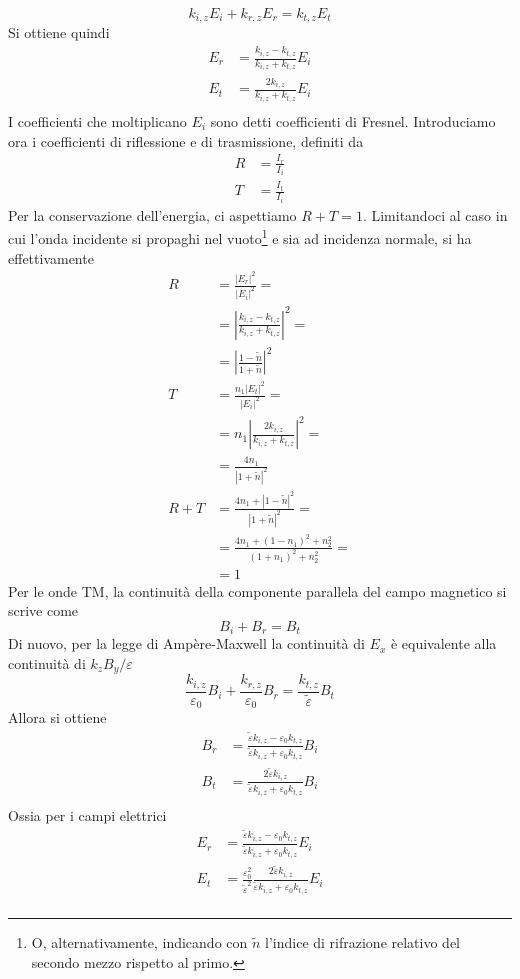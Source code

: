 \documentclass[a4paper,11pt]{book}
\newcommand{\R}{\mathbb{R}}
\theoremstyle{theorem}
\theoremstyle{definition}
\begin{document}
\[k_{i,z}E_i+k_{r,z}E_r=k_{t,z}E_t\]
Si ottiene quindi
\begin{align*}
	E_r&=\frac{k_{i,z}-k_{t,z}}{k_{i,z}+k_{t,z}}E_i\\
	E_t&=\frac{2k_{i,z}}{k_{i,z}+k_{t,z}}E_i\\
\end{align*}
I coefficienti che moltiplicano $E_i$ sono detti coefficienti di Fresnel. Introduciamo ora i coefficienti di riflessione e di trasmissione, definiti da
\begin{align*}
	R&=\frac{I_r}{I_i}\\T&=\frac{I_t}{I_i}
\end{align*}
Per la conservazione dell'energia, ci aspettiamo $R+T=1$. Limitandoci al caso in cui l'onda incidente si propaghi nel vuoto\footnote{O, alternativamente, indicando con $\tilde{n}$ l'indice di rifrazione relativo del secondo mezzo rispetto al primo.} e sia ad incidenza normale, si ha effettivamente
\begin{align*}
	R&=\frac{|E_r|^2}{|E_i|^2}=\\&=\left|\frac{k_{i,z}-k_{t,z}}{k_{i,z}+k_{t,z}}\right|^2=\\&=\left|\frac{1-\tilde{n}}{1+\tilde{n}}\right|^2\\T&=\frac{n_1|E_t|^2}{|E_i|^2}=\\&=n_1\left|\frac{2k_{i,z}}{k_{i,z}+k_{t,z}}\right|^2=\\&=\frac{4n_1}{|1+\tilde{n}|^2}\\R+T&=\frac{4n_1+|1-\tilde{n}|^2}{|1+\tilde{n}|^2}=\\&=\frac{4n_1+(1-n_1)^2+n_2^2}{(1+n_1)^2+n_2^2}=\\&=1
\end{align*}
Per le onde TM, la continuità della componente parallela del campo magnetico si scrive come
\[B_i+B_r=B_t\]
Di nuovo, per la legge di Ampère-Maxwell la continuità di $E_x$ è equivalente alla continuità di $k_zB_y/\varepsilon$
\[\frac{k_{i,z}}{\varepsilon_0}B_i+\frac{k_{r,z}}{\varepsilon_0}B_r=\frac{k_{t,z}}{\tilde\varepsilon}B_t\]
Allora si ottiene
\begin{align*}
B_r&=\frac{\tilde{\varepsilon}k_{i,z}-\varepsilon_0k_{t,z}}{\tilde{\varepsilon}k_{i,z}+\varepsilon_0k_{t,z}}B_i\\
B_t&=\frac{2\tilde{\varepsilon}k_{i,z}}{\tilde{\varepsilon}k_{i,z}+\varepsilon_0k_{t,z}}B_i\\
\end{align*}
Ossia per i campi elettrici
\begin{align*}
E_r&=\frac{\tilde{\varepsilon}k_{i,z}-\varepsilon_0k_{t,z}}{\tilde{\varepsilon}k_{i,z}+\varepsilon_0k_{t,z}}E_i\\
E_t&=\frac{\varepsilon_0^2}{\tilde{\varepsilon}^2}\frac{2\tilde{\varepsilon}k_{i,z}}{\tilde{\varepsilon}k_{i,z}+\varepsilon_0k_{t,z}}E_i\\
\end{align*}
\end{document}

